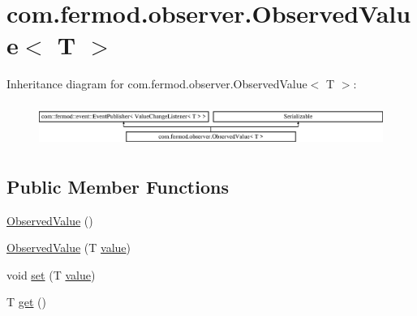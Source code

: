 \hypertarget{classcom_1_1fermod_1_1observer_1_1ObservedValue}{}\section{com.\+fermod.\+observer.\+Observed\+Value$<$ T $>$}
\label{classcom_1_1fermod_1_1observer_1_1ObservedValue}
Inheritance diagram for com.\+fermod.\+observer.\+Observed\+Value$<$ T $>$\+:\begin{figure}[H]
\begin{center}
\leavevmode
\includegraphics[height=1.424936cm]{d8/d55/classcom_1_1fermod_1_1observer_1_1ObservedValue}
\end{center}
\end{figure}
\subsection*{Public Member Functions}
\begin{DoxyCompactItemize}
\item 
\mbox{\hyperlink{classcom_1_1fermod_1_1observer_1_1ObservedValue_a1df366b11a2df10c94ca920c63888417}{Observed\+Value}} ()
\item 
\mbox{\hyperlink{classcom_1_1fermod_1_1observer_1_1ObservedValue_a4707162b16bd900e8ab85b67d45de32f}{Observed\+Value}} (T \mbox{\hyperlink{classcom_1_1fermod_1_1observer_1_1ObservedValue_a947edfec1982817155067f495b0c8cf7}{value}})
\item 
void \mbox{\hyperlink{classcom_1_1fermod_1_1observer_1_1ObservedValue_a40797fd2e2d1fb512ce6be7a35e67af2}{set}} (T \mbox{\hyperlink{classcom_1_1fermod_1_1observer_1_1ObservedValue_a947edfec1982817155067f495b0c8cf7}{value}})
\item 
T \mbox{\hyperlink{classcom_1_1fermod_1_1observer_1_1ObservedValue_aba42362d9ecdba6a831a148d182b6fe6}{get}} ()
\end{DoxyCompactItemize}
